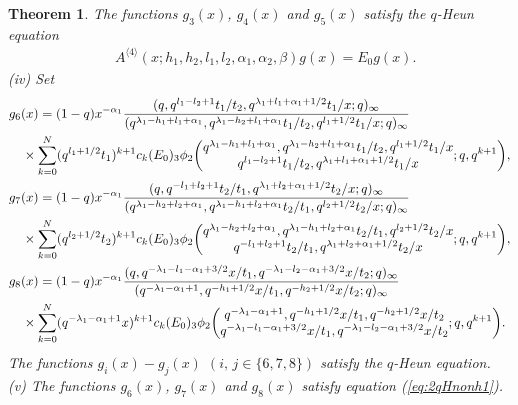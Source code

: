 \documentclass[10pt,a4paper]{amsart}
\newtheorem{thm}{Theorem}
\begin{document}
\begin{thm}
The functions $g_3(x)$,  $g_4(x)$ and $g_5(x)$ satisfy the $q$-Heun equation
  \begin{align*}
    & A^{\langle 4 \rangle} (x; h_{1}, h_{2}, l_{1}, l_{2}, \alpha_{1}, \alpha_{2}, \beta) g(x) = E_0 g(x) . 
  \end{align*}
(iv)
Set 
  \begin{align*}
    &g_{6}(x) = (1 - q)x^{-\alpha_{1}}\frac{(q, q^{l_{1} - l_{2} + 1}t_{1}/t_{2}, q^{ \lambda _{1} + l_{1} +\alpha _{1} + 1/2}t_{1}/x; q)_{\infty}}{(q^{ \lambda _{1} -h_{1} + l_{1} + \alpha _{1} }, q^{ \lambda _{1} -h_{2} + l_{1} + \alpha _{1} }t_{1}/t_{2}, q^{l_{1} + 1/2}t_{1}/x; q)_{\infty}} \\
    &\quad \times \sum_{k = 0}^{N} (q^{l_{1} + 1/2}t_{1})^{k+1} c_k (E_{0}) {}_3\phi_2 \biggl( \begin{array}{@{}c@{}} q^{ \lambda _{1} -h_{1} + l_{1} + \alpha _{1} }, q^{ \lambda _{1} -h_{2} + l_{1} + \alpha _{1} }t_{1}/t_{2}, q^{l_{1} + 1/2}t_{1}/x \\
q^{l_{1} - l_{2} + 1}t_{1}/t_{2}, q^{\lambda _{1} + l_{1} + \alpha _{1} + 1/2}t_{1}/x \end{array} ;q,q^{k+1} \biggr), \\
    &g_{7}(x) = (1 - q)x^{-\alpha_{1}}\frac{(q,q^{- l_{1} + l_{2} + 1}t_{2}/t_{1}, q^{\lambda _{1} + l_{2} + \alpha _{1} + 1/2}t_{2}/x; q)_{\infty}}{(q^{ \lambda _{1} -h_{2} + l_{2} + \alpha _{1} }, q^{ \lambda _{1} -h_{1} + l_{2} + \alpha _{1} }t_{2}/t_{1},  q^{l_{2} + 1/2}t_{2}/x; q)_{\infty}} \\
    &\quad \times \sum_{k = 0}^{N} (q^{l_{2} + 1/2}t_{2})^{k+1}  c_k (E_{0}) {}_3\phi_2 \biggl( \begin{array}{@{}c@{}} q^{ \lambda _{1} -h_{2} + l_{2} + \alpha _{1} }, q^{ \lambda _{1} -h_{1} + l_{2}  + \alpha _{1} }t_{2}/t_{1},  q^{l_{2} + 1/2}t_{2}/x \\
q^{- l_{1} + l_{2} + 1}t_{2}/t_{1}, q^{\lambda _{1} + l_{2} + \alpha _{1} + 1/2}t_{2}/x \end{array} ;q,q^{k+1} \biggr), \\
    &g_{8}(x) = (1 - q)x^{-\alpha_{1}}\frac{(q, q^{- \lambda _{1} -l_{1} - \alpha _{1} + 3/2}x/t_{1}, q^{- \lambda _{1} -l_{2}  - \alpha _{1} + 3/2}x/t_{2} ; q)_{\infty}}{( q^{- \lambda _{1} - \alpha _{1} + 1}, q^{-h_{1} + 1/2}x/t_{1}, q^{-h_{2} + 1/2}x/t_{2}; q)_{\infty}} \\
    &\quad \times \sum_{k = 0}^{N} (q^{- \lambda _{1} - \alpha _{1} + 1}x)^{k+1}  c_k (E_{0}) {}_3\phi_2 \biggl( \begin{array}{@{}c@{}} q^{- \lambda _{1} - \alpha _{1} + 1}, q^{-h_{1} + 1/2}x/t_{1}, q^{-h_{2} + 1/2}x/t_{2} \\
q^{- \lambda _{1} -l_{1} - \alpha _{1} + 3/2}x/t_{1}, q^{- \lambda _{1} -l_{2} - \alpha _{1} + 3/2}x/t_{2} \end{array} ;q,q^{k+1} \biggr).
  \end{align*}
The functions $g_{i} (x)- g_{j} (x)$ $(i, \, j \in \{6, 7, 8\})$ satisfy the $q$-Heun equation.
\\
(v) The functions $g_6(x)$,  $g_7(x)$ and $g_8(x)$ satisfy equation (\ref{eq:2qHnonh1}).
 \end{thm}
\end{document}
